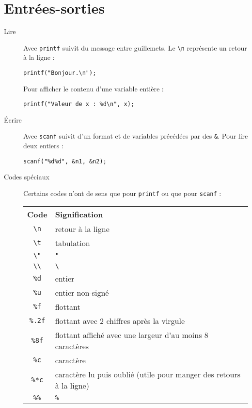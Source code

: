 \documentclass[a4paper,10pt]{article}
\begin{document}
  \section{Entrées-sorties}
  \begin{description}
    \item[Lire] Avec \texttt{printf} suivit du message entre guillemets. Le \texttt{\textbackslash n} représente un retour à la ligne :
      \begin{verbatim}
printf("Bonjour.\n");
      \end{verbatim}
      Pour afficher le contenu d'une variable entière :
      \begin{verbatim}
printf("Valeur de x : %d\n", x);
      \end{verbatim}
    \item[Écrire] Avec \texttt{scanf} suivit d'un format et de variables précédées par des \texttt{\&}. Pour lire deux entiers :
      \begin{verbatim}
scanf("%d%d", &n1, &n2);
      \end{verbatim}
    \item[Codes spéciaux] Certains codes n'ont de sens que pour \texttt{printf} ou que pour \texttt{scanf} :\\
      \begin{tabu}{c|l}
        Code & Signification\\
        \hline
        \texttt{\textbackslash n} & retour à la ligne\\
        \texttt{\textbackslash t} & tabulation\\
        \texttt{\textbackslash "} & \texttt{"}\\
        \texttt{\textbackslash \textbackslash} & \texttt{\textbackslash}\\
        \hline
        \texttt{\%d} & entier\\
        \texttt{\%u} & entier non-signé\\
        \texttt{\%f} & flottant\\
        \texttt{\%.2f} & flottant avec 2 chiffres après la virgule\\
        \texttt{\%8f} & flottant affiché avec une largeur d'au moins 8 caractères\\
        \texttt{\%c} & caractère\\
        \texttt{\%*c} & caractère lu puis oublié (utile pour manger des retours à la ligne)\\
        \texttt{\%\%} & \texttt{\%}\\
      \end{tabu}
  \end{description}
\end{document}
